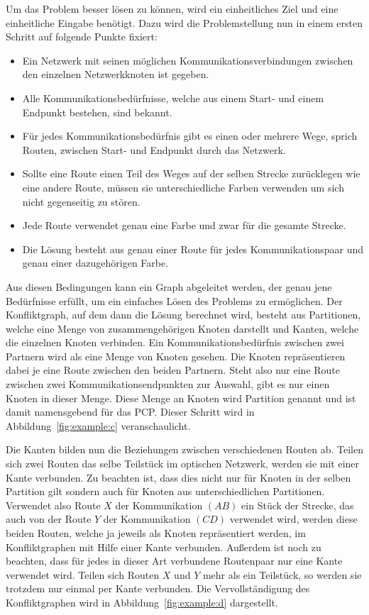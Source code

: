 Um das Problem besser lösen zu können, wird ein einheitliches Ziel und eine einheitliche Eingabe benötigt. Dazu wird die Problemstellung nun in einem ersten Schritt auf folgende Punkte fixiert:
\begin{itemize}
	\item Ein Netzwerk mit seinen möglichen Kommunikationsverbindungen zwischen den einzelnen Netzwerkknoten ist gegeben.
	\item Alle Kommunikationsbedürfnisse, welche aus einem Start- und einem Endpunkt bestehen, sind bekannt.
	\item Für jedes Kommunikationsbedürfnis gibt es einen oder mehrere Wege, sprich Routen, zwischen Start- und Endpunkt durch das Netzwerk.
	\item Sollte eine Route einen Teil des Weges auf der selben Strecke zurücklegen wie eine andere Route, müssen sie unterschiedliche Farben verwenden um sich nicht gegenseitig zu stören.
	\item Jede Route verwendet genau eine Farbe und zwar für die gesamte Strecke.
	\item Die Lösung besteht aus genau einer Route für jedes Kommunikationspaar und genau einer dazugehörigen Farbe.
\end{itemize}

Aus diesen Bedingungen kann ein Graph abgeleitet werden, der genau jene Bedürfnisse erfüllt, um ein einfaches Lösen des Problems zu ermöglichen. Der Konfliktgraph, auf dem dann die Lösung berechnet wird, besteht aus Partitionen, welche eine Menge von zusammengehörigen Knoten darstellt und Kanten, welche die einzelnen Knoten verbinden. Ein Kommunikationsbedürfnis zwischen zwei Partnern wird als eine Menge von Knoten gesehen. Die Knoten repräsentieren dabei je eine Route zwischen den beiden Partnern. Steht also nur eine Route zwischen zwei Kommunikationsendpunkten zur Auswahl, gibt es nur einen Knoten in dieser Menge. Diese Menge an Knoten wird Partition genannt und ist damit namensgebend für das PCP\@. Dieser Schritt wird in Abbildung~\ref{fig:example:c} veranschaulicht.

Die Kanten bilden nun die Beziehungen zwischen verschiedenen Routen ab. Teilen sich zwei Routen das selbe Teilstück im optischen Netzwerk, werden sie mit einer Kante verbunden. Zu beachten ist, dass dies nicht nur für Knoten in der selben Partition gilt sondern auch für Knoten aus unterschiedlichen Partitionen. Verwendet also Route $X$ der Kommunikation $(AB)$ ein Stück der Strecke, das auch von der Route $Y$ der Kommunikation $(CD)$ verwendet wird, werden diese beiden Routen, welche ja jeweils als Knoten repräsentiert werden, im Konfliktgraphen mit Hilfe einer Kante verbunden. Außerdem ist noch zu beachten, dass für jedes in dieser Art verbundene Routenpaar nur eine Kante verwendet wird. Teilen sich Routen $X$ und $Y$ mehr als ein Teilstück, so werden sie trotzdem nur einmal per Kante verbunden. Die Vervollständigung des Konfliktgraphen wird in Abbildung~\ref{fig:example:d} dargestellt.

